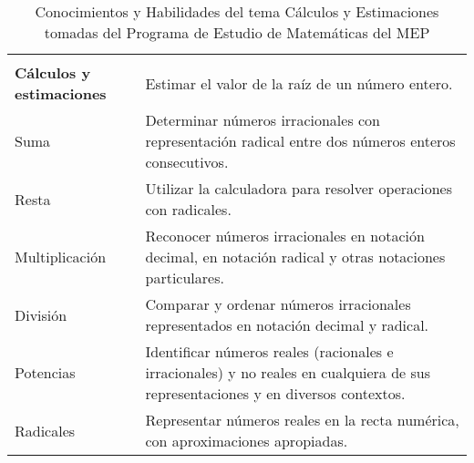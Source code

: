 \begin{table}[htbp]
\centering
\sffamily
\small
{}
\vspace{0.2cm}
 \setlength{\extrarowheight}{.4em}
\begin{tabularx}{0.99\textwidth}{l*{1}{>{\RaggedRight\arraybackslash}X}}		
\rowcolor{mycolor}\multicolumn{1}{l}{{\color{white}\textbf{Conocimientos}}}&  \multicolumn{1}{l}{{\color{white}\textbf{Habilidades}}}\\
\textbf{Cálculos y estimaciones} & Estimar el valor de la raíz de un número entero.\\
Suma & Determinar números irracionales con representación radical entre dos números enteros consecutivos.\\
Resta & Utilizar la calculadora para resolver operaciones con radicales. \\
Multiplicación & Reconocer números irracionales en notación decimal, en notación radical y otras notaciones particulares.\\
División & Comparar y ordenar números irracionales representados en notación decimal y radical.\\
Potencias & Identificar números reales (racionales e irracionales) y no reales en cualquiera de sus representaciones y en diversos contextos.\\
Radicales & Representar números reales en la recta numérica, con aproximaciones apropiadas.\\
\end{tabularx}
		\caption[Tema Cálculos y Estimaciones]{Conocimientos y Habilidades del tema Cálculos y Estimaciones tomadas del Programa de Estudio de Matemáticas del MEP} 
		\label{tab:cyhcalculosestimaciones}
\vspace{0.2cm}		
\end{table}